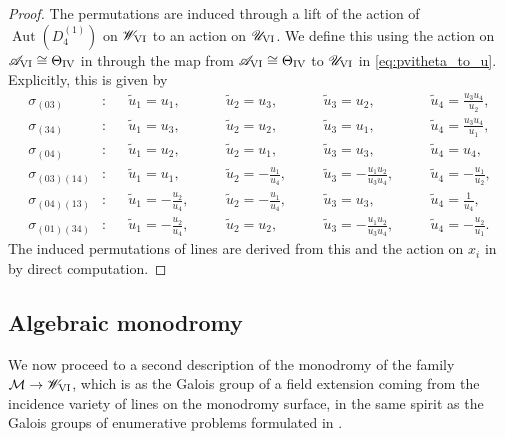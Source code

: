 \documentclass[a4paper,reqno]{amsart}
\numberwithin{equation}{section}
\DeclareMathOperator{\Aut}{Aut}
\numberwithin{equation}{section}
\begin{document}
\begin{proof}
    The permutations are induced through a lift of the action of $\Aut(D_4^{(1)})$ on $\mathscr{W}_{\rm{VI}}$ to an action on $\mathscr{U}_{\rm{VI}}$. 
    We define this using the action on $\mathscr{A}_{\rm{VI}}\cong\Theta_{\rm{IV}}$ in  through the map from $\mathscr{A}_{\rm{VI}}\cong\Theta_{\rm{IV}}$  to $\mathscr{U}_{\rm{VI}}$ in \cref{eq:pvitheta_to_u}.
Explicitly, this is given by 
\begin{align*}
	\sigma_{(03)}&: &&\tilde{u}_1=u_1,&\quad &\tilde{u}_2 = u_3, &\quad 
    &\tilde{u}_3 = u_2,&\quad 
    &\tilde{u}_4 = \frac{u_3 u_4}{u_2},\\
	\sigma_{(34)}&: &&\tilde{u}_1=u_3,&\quad &\tilde{u}_2 = u_2,&\quad 
    &\tilde{u}_3 = u_1,&\quad 
    &\tilde{u}_4 = \frac{u_3 u_4}{u_1},\\
	\sigma_{(04)}&: &&\tilde{u}_1=u_2,&\quad &\tilde{u}_2 =u_1,&\quad 
    &\tilde{u}_3 =u_3,&\quad 
    &\tilde{u}_4 = u_4,\\
	\sigma_{(03)(14)}&: &&\tilde{u}_1=u_1,&\quad &\tilde{u}_2 = - \frac{u_1}{u_4},&\quad 
    &\tilde{u}_3 = - \frac{u_1 u_2}{u_3 u_4},&\quad 
    &\tilde{u}_4 = - \frac{u_1}{u_2},\\
	\sigma_{(04)(13)}&: &&\tilde{u}_1=- \frac{u_2}{u_4},&\quad 
    &\tilde{u}_2 = - \frac{u_1}{u_4},&\quad 
    &\tilde{u}_3 = u_3,&\quad 
    &\tilde{u}_4 = \frac{1}{u_4},\\
	\sigma_{(01)(34)}&: &&\tilde{u}_1=-\frac{u_2}{u_4},&\quad &\tilde{u}_2 = u_2,&\quad 
    &\tilde{u}_3 = - \frac{u_1 u_2}{u_3 u_4}, &\quad 
    &\tilde{u}_4 = - \frac{u_2}{u_1}.
\end{align*}
        The induced permutations of lines are derived from this and the action on $x_i$ in  by direct computation.
\end{proof}




\subsection{Algebraic monodromy}

\label{subsec:algmonodromyPVI}
We now proceed to a second description of the monodromy of the family $\mathcal{M} \to \mathscr{W}_{\rm{VI}}$, which is as the Galois group of a field extension coming from the incidence variety of lines on the monodromy surface, in the same spirit as the Galois groups of enumerative problems formulated in \cite{harris1979}.
\end{document}
